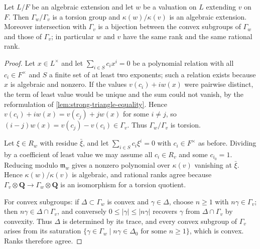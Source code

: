 \begin{lemma}\label{lem:algebraic-extension-invariants}
Let $L/F$ be an algebraic extension and let $w$ be a valuation on $L$
extending $v$ on $F$. Then $\Gamma_w/\Gamma_v$ is a torsion group and
$\kappa(w)/\kappa(v)$ is an algebraic extension. Moreover intersection
with $\Gamma_v$ is a bijection between the convex subgroups of $\Gamma_w$
and those of $\Gamma_v$; in particular $w$ and $v$ have the same rank and
the same rational rank.
\end{lemma}
\begin{proof}
Let $x\in L^\times$ and let $\sum_{i\in S}c_ix^i=0$ be a polynomial
relation with all $c_i\in F^\times$ and $S$ a finite set of at least two
exponents; such a relation exists because $x$ is algebraic and nonzero.
If the values $v(c_i)+iw(x)$ were pairwise distinct, the term of least
value would be unique and the sum could not vanish, by the reformulation
of \cref{lem:strong-triangle-equality}. Hence
$v(c_i)+iw(x)=v(c_j)+jw(x)$ for some $i\neq j$, so
$(i-j)w(x)=v(c_j)-v(c_i)\in\Gamma_v$. Thus $\Gamma_w/\Gamma_v$ is
torsion.

Let $\xi\in R_w$ with residue $\bar\xi$, and let
$\sum_{i\in S}c_i\xi^i=0$ with $c_i\in F^\times$ as before. Dividing by a
coefficient of least value we may assume all $c_i\in R_v$ and some
$c_{i_0}=1$. Reducing modulo $\mathfrak m_w$ gives a nonzero polynomial
over $\kappa(v)$ vanishing at $\bar\xi$. Hence $\kappa(w)/\kappa(v)$ is
algebraic, and rational ranks agree because
$\Gamma_v\otimes\mathbf Q\to\Gamma_w\otimes\mathbf Q$ is an isomorphism
for a torsion quotient.

For convex subgroups: if $\Delta\subset\Gamma_w$ is convex and
$\gamma\in\Delta$, choose $n\geq1$ with $n\gamma\in\Gamma_v$; then
$n\gamma\in\Delta\cap\Gamma_v$, and conversely $0\leq|\gamma|\leq|n\gamma|$
recovers $\gamma$ from $\Delta\cap\Gamma_v$ by convexity. Thus $\Delta$ is
determined by its trace, and every convex subgroup of $\Gamma_v$ arises
from its saturation $\{\gamma\in\Gamma_w\mid n\gamma\in\Delta_0
\text{ for some }n\geq1\}$, which is convex. Ranks therefore agree.
\end{proof}

